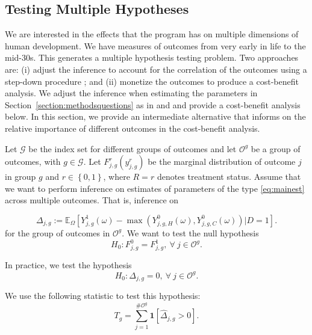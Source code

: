 \subsection{Testing Multiple Hypotheses}  \label{section:counts}

We are interested in the effects that the program has on multiple dimensions of human development. We have measures of outcomes from very early in life to the mid-30s. This generates a multiple hypothesis testing problem. Two approaches are: (i) adjust the inference to account for the correlation of the outcomes using a step-down procedure \citep{Lehman_Romano_2005_AnnStat,Romano_Shaikh_2006_AnnStat}; and (ii) monetize the outcomes to produce a cost-benefit analysis. We adjust the inference when estimating the parameters in Section~\ref{section:methodsquestions} as in \citet{Lehman_Romano_2005_AnnStat} and \citet{Romano_Shaikh_2006_AnnStat} and provide a cost-benefit analysis below. In this section, we provide an intermediate alternative that informs on the relative importance of different outcomes in the cost-benefit analysis.

Let $\mathcal{G}$ be the index set for different groups of outcomes and let $\mathcal{O}^{g}$ be a group of outcomes, with $g \in \mathcal{G}$. Let $F_{j,g}^r \left( y_{j,g}^r \right) $ be the marginal distribution of outcome $j$ in group $g$ and $r \in \left\{ 0,1 \right\}$, where $R = r$ denotes treatment status. Assume that we want to perform inference on estimates of parameters of the type \eqref{eq:mainest} across multiple outcomes. That is, inference on

\begin{equation}
\Delta_{j,g} := \mathbb{E}_{\Omega} \left[ Y_{j,g}^1 \left( \omega \right) -  \max \left(  Y_{j,g,H}^0 \left( \omega \right) ,  Y_{j,g,C}^0 \left( \omega \right)  \right) | D =1 \right].
\end{equation}
for the group of outcomes in $\mathcal{O}^{g}$. We want to test the null hypothesis
\begin{equation}
H_{0} : F_{j,g}^0 = F_{j,g}^1, \ \forall \ j \in \mathcal{O}^{g}.
\end{equation}

In practice, we test the hypothesis
\begin{equation}
H_{0} : \Delta_{j,g} = 0, \ \forall \ j \in \mathcal{O}^{g}.
\end{equation}

We use the following statistic to test this hypothesis:
\begin{equation}
T_{g} = \sum _{j=1}^{\# \mathcal{O}^g} \mathbf{1} \left[ \widehat{\Delta}_{j,g} > 0\right]. \label{eq:count}
\end{equation}


